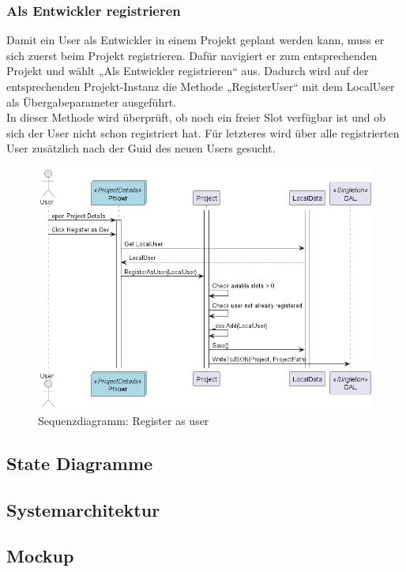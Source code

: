 \subsubsection{Als Entwickler registrieren}
Damit ein User als Entwickler in einem Projekt geplant werden kann, muss er sich zuerst beim Projekt registrieren.
Dafür navigiert er zum entsprechenden Projekt und wählt „Als Entwickler registrieren“ aus. Dadurch wird auf der entsprechenden Projekt-Instanz
die Methode „RegisterUser“ mit dem LocalUser als Übergabeparameter ausgeführt.\\
In dieser Methode wird überprüft, ob noch ein freier Slot verfügbar ist und ob sich der User nicht schon registriert hat. 
Für letzteres wird über alle registrierten User zusätzlich nach der Guid des neuen Users gesucht.
\begin{figure}[H]
  \begin{center}
    \includegraphics[width=0.7\linewidth]{../content/diagrams/sequence/registerAsUserSequence/registerAsUserSequence.png}
    \caption{Sequenzdiagramm: Register as user}
  \end{center}
\end{figure}
\newpage

\subsection{State Diagramme}
\newpage
\subsection{Systemarchitektur}
\newpage
\subsection{Mockup}
